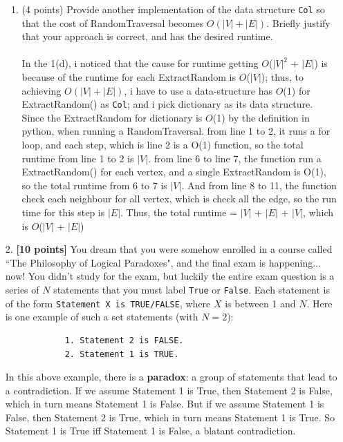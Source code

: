 \documentclass{assignment-263}
\begin{document}
\begin{enumerate}
\begin{enumerate}
\item (4 points)
Provide another implementation of the data structure \verb|Col| so that the cost of RandomTraversal 
becomes $O(|V|+|E|)$. Briefly justify that your approach is correct, and has the desired runtime.\\\\
In the 1(d), i noticed that the cause for runtime getting $O$($|V|^2$ + $|E|$) is because of the runtime for each ExtractRandom is $O$($|V|$); thus, to achieving $O(|V|+|E|)$, i have to use a data-structure has $O$(1) for ExtractRandom() as \verb|Col|; and i pick dictionary as its data structure.\\
Since the ExtractRandom for dictionary is $O$(1) by the definition in python, when running a RandomTraversal.  from line 1 to 2, it runs a for loop, and each step, which is line 2 is a  O(1) function, so the total runtime from line 1 to 2 is $|V|$. from line 6 to line 7, the function run a ExtractRandom() for each vertex, and a single ExtractRandom is O(1), so the total runtime from 6 to 7 is $|V|$. And from line 8 to 11, the function check each neighbour for all vertex, which is check all the edge, so the run time for this step is $|E|$.
Thus, the total runtime = $|V|$ + $|E|$ + $|V|$, which is $O$($|V|$ + $|E|$)

\end{enumerate}

\item[2.]  \textbf{[10 points]} 
    You dream that you were somehow enrolled in a course called ``The Philosophy of Logical Paradoxes",
    and the final exam is happening... now! You didn't study for the exam, but luckily
    the entire exam question is a series of $N$ statements that you must label \verb|True| or \verb|False|.
    Each statement is of the form \verb|Statement X is TRUE/FALSE|, where $X$ is between 1 and $N$.
    Here is one example of such a set statements (with $N=2$):

	\begin{verbatim}
		    1. Statement 2 is FALSE.
		    2. Statement 1 is TRUE.
	\end{verbatim}

    In this above example, there is a \textbf{paradox}: a group of statements that lead to a contradiction.
	If we assume Statement 1 is True, then Statement 2 is False, which
	in turn means Statement 1 is False. But if we assume Statement 1 is
	False, then Statement 2 is True, which in turn means Statement 1
	is True. So Statement 1 is True iff Statement 1 is False, a blatant
	contradiction.


\end{enumerate}
\end{document}
